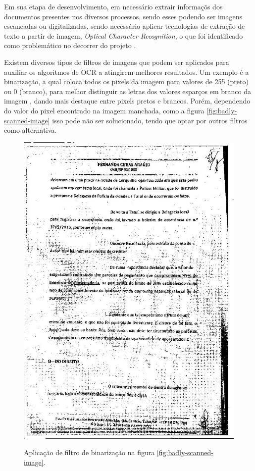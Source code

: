 Em sua etapa de desenvolvimento, era necessário extrair informaçõs dos documentos presentes nos diversos processos, sendo esses podendo ser imagens escaneadas ou digitalizadas, sendo necessário aplicar tecnologias de extração de texto a partir de imagem, \textit{Optical Character Recognition}, o que foi identificado como problemático no decorrer do projeto \cite{cnn-for-STF}.

Existem diversos tipos de filtros de imagens que podem ser aplicados para auxiliar os algoritmos de OCR a atingirem melhores resultados. Um exemplo é a binarização, a qual coloca todos os pixels da imagem para valores de 255 (preto) ou 0 (branco), para melhor distinguir as letras dos valores esparços em branco da imagem \cite{image-binarization}, dando mais destaque entre pixels pretos e brancos. Porém, dependendo do valor do pixel encontrado na imagem manchada, como a figura \ref{fig:badly-scanned-image} isso pode não ser solucionado, tendo que optar por outros filtros como alternativa.

\begin{figure}[H]
    \centering
    \caption{Aplicação de filtro de binarização na figura \ref{fig:badly-scanned-image}.}
    \includegraphics[scale=0.3]{figuras/binarized-badly-scanned-image.jpg}
    \label{fig:binarized-badly-scanned-image}
\end{figure}

